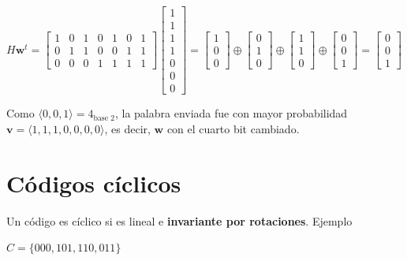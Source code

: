 \documentclass[10pt,a4paper]{article}
\begin{document}
\begin{center}
$H\textbf{w}^t = \left[ \begin{array}{ccccccc} 1&0&1&0&1&0&1\\ 0&1&1&0&0&1&1\\ 0&0&0&1&1&1&1 \end{array} \right] \left[ \begin{array}{c} 1\\1\\1\\1\\0\\0\\0 \end{array} \right] = \left[ \begin{array}{c} 1\\0\\0 \end{array} \right] \oplus \left[ \begin{array}{c} 0\\1\\0 \end{array} \right] \oplus \left[ \begin{array}{c} 1\\1\\0 \end{array} \right] \oplus \left[ \begin{array}{c} 0\\0\\1 \end{array} \right] = \left[ \begin{array}{c} 0\\0\\1\end{array} \right] $
\end{center}

Como $\langle 0, 0, 1\rangle = 4_{\text{base } 2}$, la palabra enviada fue con mayor probabilidad $\textbf{v} = \langle 1,1,1,0,0,0,0\rangle$, es decir, $\textbf{w}$ con el cuarto bit cambiado.

\section*{Códigos cíclicos}

Un código es cíclico si es lineal e \textbf{invariante por rotaciones}. Ejemplo

\begin{center}
$C = \{000, 101, 110, 011\}$
\end{center}
\end{document}

